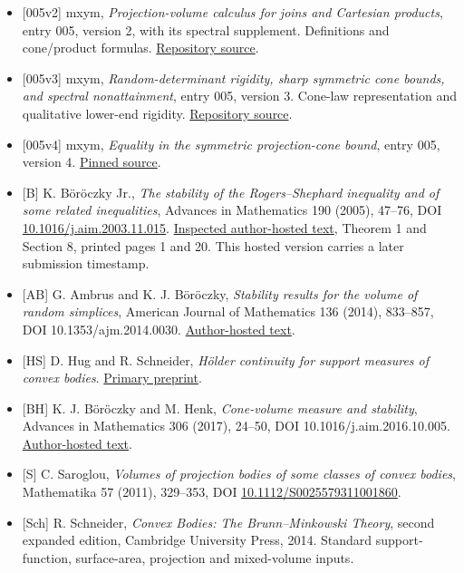 \documentclass[
  11pt,
]{article}
\providecommand{\tightlist}{%
  \setlength{\itemsep}{0pt}\setlength{\parskip}{0pt}}
\begin{document}
\begin{itemize}
\tightlist
\item
  {[}005v2{]} mxym, \emph{Projection-volume calculus for joins and
  Cartesian products}, entry 005, version 2, with its spectral
  supplement. Definitions and cone/product formulas.
  \href{https://github.com/mxym/math/tree/dd969ea280508a15995fbe83a80cac0f6d227f73/preprints/005-simplex-product-optimum/v2}{Repository
  source}.
\item
  {[}005v3{]} mxym, \emph{Random-determinant rigidity, sharp symmetric
  cone bounds, and spectral nonattainment}, entry 005, version 3.
  Cone-law representation and qualitative lower-end rigidity.
  \href{https://github.com/mxym/math/tree/dd969ea280508a15995fbe83a80cac0f6d227f73/preprints/005-simplex-product-optimum/v3}{Repository
  source}.
\item
  {[}005v4{]} mxym, \emph{Equality in the symmetric projection-cone
  bound}, entry 005, version 4.
  \href{https://github.com/mxym/math/blob/dd969ea280508a15995fbe83a80cac0f6d227f73/preprints/005-simplex-product-optimum/v4/paper.md}{Pinned
  source}.
\item
  {[}B{]} K. Böröczky Jr., \emph{The stability of the Rogers--Shephard
  inequality and of some related inequalities}, Advances in Mathematics
  190 (2005), 47--76, DOI
  \href{https://doi.org/10.1016/j.aim.2003.11.015}{10.1016/j.aim.2003.11.015}.
  \href{https://www.renyi.hu/~carlos/rogerstab.pdf}{Inspected
  author-hosted text}, Theorem 1 and Section 8, printed pages 1 and 20.
  This hosted version carries a later submission timestamp.
\item
  {[}AB{]} G. Ambrus and K. J. Böröczky, \emph{Stability results for the
  volume of random simplices}, American Journal of Mathematics 136
  (2014), 833--857, DOI 10.1353/ajm.2014.0030.
  \href{https://www.renyi.hu/~carlos/randomsimplex.pdf}{Author-hosted
  text}.
\item
  {[}HS{]} D. Hug and R. Schneider, \emph{Hölder continuity for support
  measures of convex bodies}.
  \href{https://arxiv.org/abs/1501.06214}{Primary preprint}.
\item
  {[}BH{]} K. J. Böröczky and M. Henk, \emph{Cone-volume measure and
  stability}, Advances in Mathematics 306 (2017), 24--50, DOI
  10.1016/j.aim.2016.10.005.
  \href{https://users.renyi.hu/~carlos/cone-volume-stability.pdf}{Author-hosted
  text}.
\item
  {[}S{]} C. Saroglou, \emph{Volumes of projection bodies of some
  classes of convex bodies}, Mathematika 57 (2011), 329--353, DOI
  \href{https://doi.org/10.1112/S0025579311001860}{10.1112/S0025579311001860}.
\item
  {[}Sch{]} R. Schneider, \emph{Convex Bodies: The Brunn--Minkowski
  Theory}, second expanded edition, Cambridge University Press, 2014.
  Standard support-function, surface-area, projection and mixed-volume
  inputs.
\end{itemize}
\end{document}
